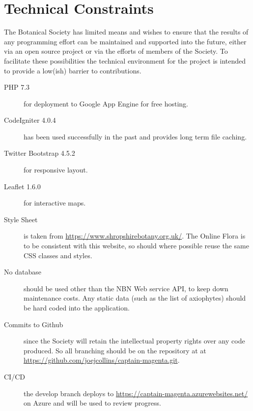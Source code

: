 \documentclass[a4paper,12pt,landscape]{article}
\begin{document}
\section{Technical Constraints}%

The Botanical Society has limited means
and wishes to ensure that the results of any programming effort
can be maintained and supported
into the future,
either via an open source project or via the efforts of members of the Society.
To facilitate these possibilities
the technical environment for the project is intended 
to provide a low(ish) barrier to contributions.

\begin{description}
    \item[PHP 7.3] for deployment to Google App Engine for free hosting.
    \item[CodeIgniter 4.0.4] has been used successfully in the past and provides long term file caching.
    \item[Twitter Bootstrap 4.5.2] for responsive layout.
    \item[Leaflet 1.6.0] for interactive maps.
    \item[Style Sheet] is taken from \url{https://www.shropshirebotany.org.uk/}.
      The Online Flora is to be consistent with this website,
      so should where possible reuse the same CSS classes and styles.
    \item[No database] should be used other than the NBN Web service API,
      to keep down maintenance costs.
      Any static data 
      (such as the list of axiophytes)
      should be hard coded into the application.

    \item[Commits to Github] since the Society will retain the intellectual property rights
      over any code produced.
      So all branching should be on the repository at
      at \url{https://github.com/joejcollins/captain-magenta.git}.
    \item[CI/CD] the develop branch deploys to \url{https://captain-magenta.azurewebsites.net/} on Azure
      and will be used to review progress.
\end{description}
\end{document}
